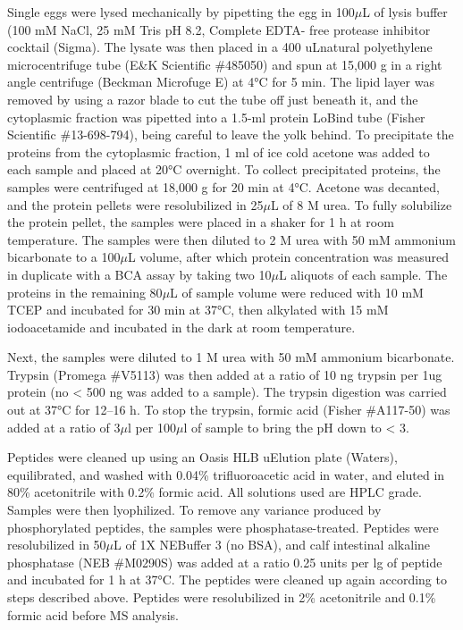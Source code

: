 \documentclass[11pt,]{article}
\begin{document}
Single eggs were lysed mechanically by pipetting the egg in 100\(\mu\)L
of lysis buffer (100 mM NaCl, 25 mM Tris pH 8.2, Complete EDTA- free
protease inhibitor cocktail (Sigma). The lysate was then placed in a 400
uLnatural polyethylene microcentrifuge tube (E\&K Scientific \#485050)
and spun at 15,000 g in a right angle centrifuge (Beckman Microfuge E)
at 4°C for 5 min. The lipid layer was removed by using a razor blade to
cut the tube off just beneath it, and the cytoplasmic fraction was
pipetted into a 1.5-ml protein LoBind tube (Fisher Scientific
\#13-698-794), being careful to leave the yolk behind. To precipitate
the proteins from the cytoplasmic fraction, 1 ml of ice cold acetone was
added to each sample and placed at 20°C overnight. To collect
precipitated proteins, the samples were centrifuged at 18,000 g for 20
min at 4°C. Acetone was decanted, and the protein pellets were
resolubilized in 25\(\mu\)L of 8 M urea. To fully solubilize the protein
pellet, the samples were placed in a shaker for 1 h at room temperature.
The samples were then diluted to 2 M urea with 50 mM ammonium
bicarbonate to a 100\(\mu\)L volume, after which protein concentration
was measured in duplicate with a BCA assay by taking two 10\(\mu\)L
aliquots of each sample. The proteins in the remaining 80\(\mu\)L of
sample volume were reduced with 10 mM TCEP and incubated for 30 min at
37°C, then alkylated with 15 mM iodoacetamide and incubated in the dark
at room temperature.

Next, the samples were diluted to 1 M urea with 50 mM ammonium
bicarbonate. Trypsin (Promega \#V5113) was then added at a ratio of 10
ng trypsin per 1ug protein (no \textless{} 500 ng was added to a
sample). The trypsin digestion was carried out at 37°C for 12--16 h. To
stop the trypsin, formic acid (Fisher \#A117-50) was added at a ratio of
3\(\mu\)l per 100\(\mu\)l of sample to bring the pH down to \textless{}
3.

Peptides were cleaned up using an Oasis HLB uElution plate (Waters),
equilibrated, and washed with 0.04\% trifluoroacetic acid in water, and
eluted in 80\% acetonitrile with 0.2\% formic acid. All solutions used
are HPLC grade. Samples were then lyophilized. To remove any variance
produced by phosphorylated peptides, the samples were
phosphatase-treated. Peptides were resolubilized in 50\(\mu\)L of 1X
NEBuffer 3 (no BSA), and calf intestinal alkaline phosphatase (NEB
\#M0290S) was added at a ratio 0.25 units per lg of peptide and
incubated for 1 h at 37°C. The peptides were cleaned up again according
to steps described above. Peptides were resolubilized in 2\%
acetonitrile and 0.1\% formic acid before MS analysis.
\end{document}
